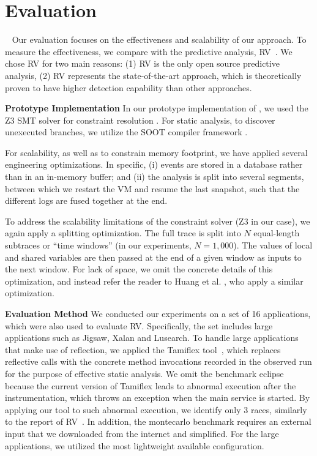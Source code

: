 \section{Evaluation}~\label{sec:eval}
Our evaluation focuses on the effectiveness  and scalability of our approach.
To measure the effectiveness, we compare with the predictive analysis, {\sf RV}~\cite{}. We chose RV for two main reasons: (1) {\sf RV} is the only open source predictive analysis, (2) {\sf RV} represents the state-of-the-art approach, which is theoretically proven to have higher detection capability than other approaches. 

{\bf Prototype Implementation}  In our prototype implementation of \tool, we used the Z3 SMT solver for constraint resolution \cite{DeMoura:2008}. For static analysis, to discover unexecuted branches, we utilize the SOOT compiler framework \cite{Vallee-Rai:1999}.

For scalability, as well as to constrain memory footprint, we have applied several engineering optimizations. In specific, (i) events are stored in a database rather than in an in-memory buffer; and (ii) the analysis is split into several segments, between which we restart the VM and resume the last snapshot, such that the different logs are fused together at the end. 

To address the scalability limitations of the constraint solver (Z3 in our case), we again apply a splitting optimization. The full trace is split into $N$ equal-length subtraces or ``time windows'' (in our experiments, $N=1,000$). The values of local and shared variables are then passed at the end of a given window as inputs to the next window. For lack of space, we omit the concrete details of this optimization, and instead refer the reader to Huang et al. \cite{HuangMR14}, who apply a similar optimization.


{\bf Evaluation Method} We conducted our experiments on a set of 16 applications, which were also used to evaluate {\sf RV}. Specifically, the set includes large applications such as {\sf Jigsaw}, {\sf Xalan} and {\sf Lusearch}. To handle large applications that make use of reflection, we applied the {\sf Tamiflex} tool~\cite{}, which replaces reflective calls with the concrete method invocations recorded in the observed run for the purpose of effective static analysis.  We omit the benchmark {\sf eclipse} because the current version of {\sf Tamiflex}  leads to abnormal execution after the instrumentation, which throws an exception when the main service is started. By applying our tool to such abnormal execution, we identify only 3 races, similarly to the report of RV~\cite{}.
In addition, the {\sf montecarlo} benchmark requires an external input that we downloaded from the internet and simplified. For the large applications, we utilized the most lightweight available configuration.


